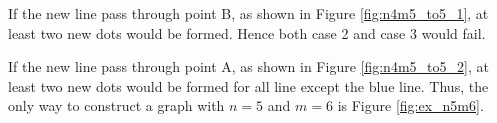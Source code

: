 \documentclass[a4paper, 12pt]{article}
\begin{document}
\begin{appendices}
If the new line pass through point B, as shown in Figure \ref{fig:n4m5_to5_1}, at least two new dots would be formed. Hence both case 2 and case 3 would fail.

If the new line pass through point A, as shown in Figure \ref{fig:n4m5_to5_2}, at least two new dots would be formed for all line except the blue line. Thus, the only way to construct a graph with $n=5$ and $m=6$ is Figure \ref{fig:ex_n5m6}.

\end{appendices}
\end{document}
